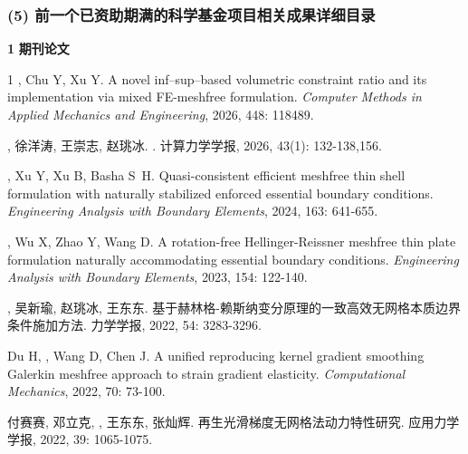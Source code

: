 \subsubsection*{\bfseries (5) 前一个已资助期满的科学基金项目相关成果详细目录}

\noindent\textcircled{\textbf{\small 1}}
\textbf{期刊论文}

\vspace{-50pt}
\begin{thebibliography}{1}
	, Chu Y, Xu Y.
	\newblock A novel inf--sup--based volumetric constraint ratio and its
  	implementation via mixed {{FE-meshfree}} formulation.
	\newblock \emph{Computer Methods in Applied Mechanics and Engineering}, 2026, 448:
  	118489.

	, 徐洋涛, 王崇志, 赵珧冰.
	.
	\newblock 计算力学学报, 2026, 43\allowbreak (1): 132-138,156.

	, Xu Y, Xu B, Basha S~H.
	\newblock Quasi-consistent efficient meshfree thin shell formulation with
	  naturally stabilized enforced essential boundary conditions.
	\newblock \emph{Engineering Analysis with Boundary Elements}, 2024, 163:
	  641-655.

	, Wu X, Zhao Y, Wang D.
	\newblock A rotation-free {{Hellinger-Reissner}} meshfree thin plate
	  formulation naturally accommodating essential boundary conditions.
	\newblock \emph{Engineering Analysis with Boundary Elements}, 2023, 154:
	  122-140.

	\textbf{}, 吴新瑜, 赵珧冰, 王东东.
	\newblock
	  {基于赫林格-赖斯纳变分原理的一致高效无网格本质边界条件施加方法}.
	\newblock 力学学报, 2022, 54: 3283-3296.

	Du H, , Wang D, Chen J.
	\newblock A unified reproducing kernel gradient smoothing {{Galerkin}} meshfree
	  approach to strain gradient elasticity.
	\newblock \emph{Computational Mechanics}, 2022, 70: 73-100.

	付赛赛, 邓立克, \textbf{}, 王东东, 张灿辉.
	\newblock 再生光滑梯度无网格法动力特性研究.
	\newblock 应用力学学报, 2022, 39: 1065-1075.

\end{thebibliography}


